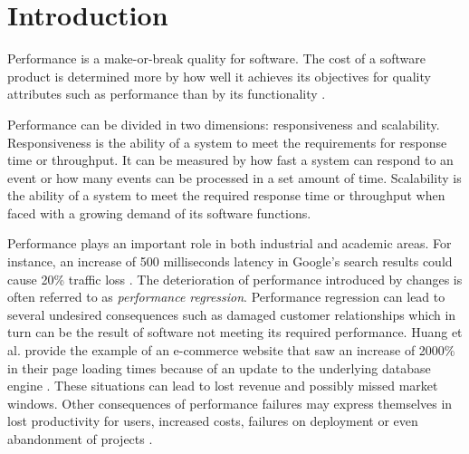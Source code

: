 \chapter{Introduction}
\label{chp:introduction}





% 

Performance is a make-or-break quality for software.
The cost of a software product is determined more by how well it achieves its objectives for quality attributes such as performance than by its functionality \cite{smith2003software}.

Performance can be divided in two dimensions: responsiveness and scalability.
Responsiveness is the ability of a system to meet the requirements for response time or throughput.
It can be measured by how fast a system can respond to an event or how many events can be processed in a set amount of time.
Scalability is the ability of a system to meet the required response time or throughput when faced with a growing demand of its software functions.

Performance plays an important role in both industrial and academic areas.
For instance, an increase of 500 milliseconds latency in Google's search results could cause 20\% traffic loss \cite{mayer2009search}.  
The deterioration of performance introduced by changes is often referred to as \emph{performance regression}.
Performance regression can lead to several undesired consequences such as damaged customer relationships which in turn can be the result of software not meeting its required performance.
Huang et al. provide the example of an e-commerce website that saw an increase of 2000\% in their page loading times because of an update to the underlying database engine \cite{huang2014performance}.
These situations can lead to lost revenue and possibly missed market windows.
Other consequences of performance failures may express themselves in lost productivity for users, increased costs, failures on deployment or even abandonment of projects \cite{woodside2007future, williams1998performance}.

